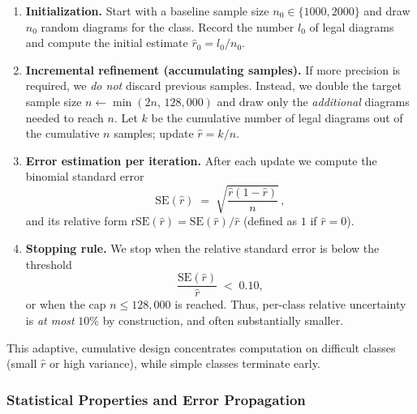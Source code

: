 \documentclass[12pt]{article}
\begin{document}
\begin{enumerate}
  \item \textbf{Initialization.} Start with a baseline sample size $n_0 \in \{1000, 2000\}$ and draw $n_0$ random diagrams for the class. Record the number $l_0$ of legal diagrams and compute the initial estimate $\hat{r}_0 = l_0/n_0$.
  \item \textbf{Incremental refinement (accumulating samples).} If more precision is required, we \emph{do not} discard previous samples. Instead, we double the target sample size $n \leftarrow \min(2n,\,128{,}000)$ and draw only the \emph{additional} diagrams needed to reach $n$. Let $k$ be the cumulative number of legal diagrams out of the cumulative $n$ samples; update $\hat{r}=k/n$.
  \item \textbf{Error estimation per iteration.} After each update we compute the binomial standard error
  \begin{equation}
     \mathrm{SE}(\hat{r}) \;=\; \sqrt{\frac{\hat{r}(1-\hat{r})}{n}}\, ,
  \end{equation}
  and its relative form $\mathrm{rSE}(\hat{r}) = \mathrm{SE}(\hat{r})/\hat{r}$ (defined as $1$ if $\hat{r}=0$).
  \item \textbf{Stopping rule.} We stop when the relative standard error is below the threshold
  \begin{equation}
     \frac{\mathrm{SE}(\hat{r})}{\hat{r}} \;<\; 0.10,
  \end{equation}
  or when the cap $n \le 128{,}000$ is reached. Thus, per-class relative uncertainty is \emph{at most} $10\%$ by construction, and often substantially smaller.
\end{enumerate}

This adaptive, cumulative design concentrates computation on difficult classes (small $\hat{r}$ or high variance), while simple classes terminate early.

\subsubsection{Statistical Properties and Error Propagation}
\end{document}

